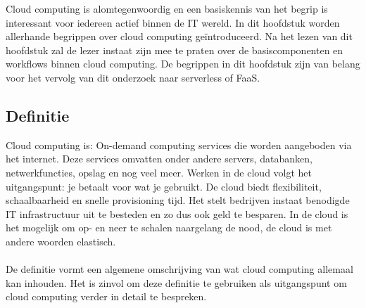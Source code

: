 Cloud computing is alomtegenwoordig en een basiskennis van het begrip is interessant voor iedereen actief binnen de IT wereld. In dit hoofdstuk worden allerhande begrippen over cloud computing geïntroduceerd. Na het lezen van dit hoofdstuk zal de lezer instaat zijn mee te praten over de basiscomponenten en workflows binnen cloud computing. De begrippen in dit hoofdstuk zijn van belang voor het vervolg van dit onderzoek naar serverless of FaaS.

\subsection{Definitie}

Cloud computing is:
\newline
On-demand computing services die worden aangeboden via het internet. Deze services omvatten onder andere servers, databanken, netwerkfuncties, opslag en nog veel meer. Werken in de cloud volgt het uitgangspunt: je betaalt voor wat je gebruikt. De cloud biedt flexibiliteit, schaalbaarheid en snelle provisioning tijd. Het stelt bedrijven instaat benodigde IT infrastructuur uit te besteden en zo dus ook geld te besparen. In de cloud is het mogelijk om op- en neer te schalen naargelang de nood, de cloud is met andere woorden elastisch. \autocite{Davis2017}
\\\\
De definitie vormt een algemene omschrijving van wat cloud computing allemaal kan inhouden. Het is zinvol om deze definitie te gebruiken als uitgangspunt om cloud computing verder in detail te bespreken.

